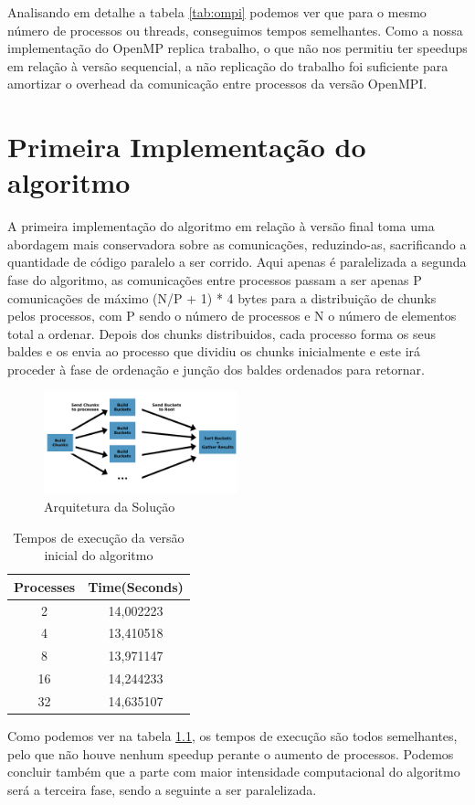 \documentclass[a4paper]{report}
\begin{document}
Analisando em detalhe a tabela \ref{tab:ompi} podemos ver que para o mesmo
número de processos ou threads, conseguimos tempos semelhantes. Como a nossa
implementação do OpenMP replica trabalho, o que não nos permitiu ter speedups em
relação à versão sequencial, a não replicação do trabalho foi suficiente para
amortizar o overhead da comunicação entre processos da versão OpenMPI.

\chapter{Primeira Implementação do algoritmo} \label{apx:slowpar}

A primeira implementação do algoritmo em relação à versão final toma uma
abordagem mais conservadora sobre as comunicações, reduzindo-as, sacrificando a
quantidade de código paralelo a ser corrido. Aqui apenas é paralelizada a
segunda fase do algoritmo, as comunicações entre processos passam a ser apenas P
comunicações de máximo (N/P + 1) * 4 bytes para a distribuição de chunks pelos
processos, com P sendo o número de processos e N o número de elementos total a
ordenar. Depois dos chunks distribuidos, cada processo forma os seus baldes e os
envia ao processo que dividiu os chunks inicialmente e este irá proceder à fase
de ordenação e junção dos baldes ordenados para retornar.

\begin{figure}[h]
    \centering
    \includegraphics[width=0.5\textwidth]{images/esquemas/algoritmo_graph1.png}
    \caption{Arquitetura da Solução}
\end{figure}

\begin{table}[h]
    \centering
    \begin{tabular}{|c|c|}
        \hline
        Processes & Time(Seconds) \\ \hline
        2         & 14,002223     \\ \hline
        4         & 13,410518     \\ \hline
        8         & 13,971147     \\ \hline
        16        & 14,244233     \\ \hline
        32        & 14,635107     \\ \hline
    \end{tabular}
    \caption{Tempos de execução da versão inicial do algoritmo}
    \label{tab:oldtimes}
\end{table}

Como podemos ver na tabela \ref{tab:oldtimes}, os tempos de execução são todos
semelhantes, pelo que não houve nenhum speedup perante o aumento de processos.
Podemos concluir também que a parte com maior intensidade computacional do
algoritmo será a terceira fase, sendo a seguinte a ser paralelizada.
\end{document}
